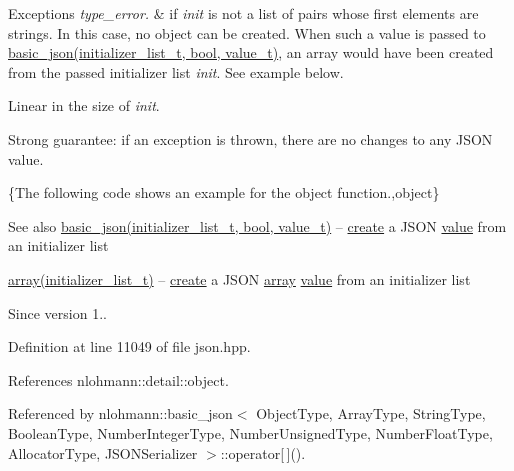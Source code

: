 \begin{DoxyExceptions}{Exceptions}
{\em type\+\_\+error.} & if {\itshape init} is not a list of pairs whose first elements are strings. In this case, no object can be created. When such a value is passed to \hyperlink{classnlohmann_1_1basic__json_ab5dfd9a2b2663b219641cb7fe59b6da2}{basic\+\_\+json(initializer\+\_\+list\+\_\+t, bool, value\+\_\+t)}, an array would have been created from the passed initializer list {\itshape init}. See example below.\\
\hline
\end{DoxyExceptions}
Linear in the size of {\itshape init}.

Strong guarantee\+: if an exception is thrown, there are no changes to any J\+S\+ON value.

\{The following code shows an example for the {\ttfamily object} function.,object\}

\begin{DoxySeeAlso}{See also}
\hyperlink{classnlohmann_1_1basic__json_ab5dfd9a2b2663b219641cb7fe59b6da2}{basic\+\_\+json(initializer\+\_\+list\+\_\+t, bool, value\+\_\+t)} -- \hyperlink{classnlohmann_1_1basic__json_a81100399cf3e2be457937be7db3f5729}{create} a J\+S\+ON \hyperlink{classnlohmann_1_1basic__json_adcf8ca5079f5db993820bf50036bf45d}{value} from an initializer list 

\hyperlink{classnlohmann_1_1basic__json_aa80485befaffcadaa39965494e0b4d2e}{array(initializer\+\_\+list\+\_\+t)} -- \hyperlink{classnlohmann_1_1basic__json_a81100399cf3e2be457937be7db3f5729}{create} a J\+S\+ON \hyperlink{classnlohmann_1_1basic__json_aa80485befaffcadaa39965494e0b4d2e}{array} \hyperlink{classnlohmann_1_1basic__json_adcf8ca5079f5db993820bf50036bf45d}{value} from an initializer list
\end{DoxySeeAlso}
\begin{DoxySince}{Since}
version 1.. 
\end{DoxySince}


Definition at line 11049 of file json.\+hpp.



References nlohmann\+::detail\+::object.



Referenced by nlohmann\+::basic\+\_\+json$<$ Object\+Type, Array\+Type, String\+Type, Boolean\+Type, Number\+Integer\+Type, Number\+Unsigned\+Type, Number\+Float\+Type, Allocator\+Type, J\+S\+O\+N\+Serializer $>$\+::operator\mbox{[}$\,$\mbox{]}().


